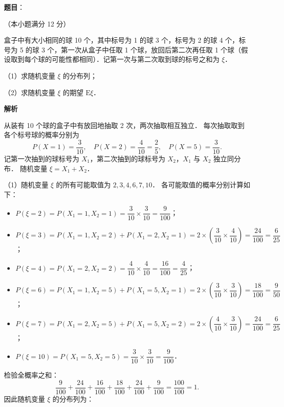 \begin{answer}

\textbf{题目}：

（本小题满分 12 分）

盒子中有大小相同的球 10 个，其中标号为 1 的球 3 个，标号为 2 的球 4 个，标号为 5 的球 3 个，第一次从盒子中任取 1 个球，放回后第二次再任取 1 个球（假设取到每个球的可能性都相同）．记第一次与第二次取到球的标号之和为 $\xi$．

（1）求随机变量 $\xi$ 的分布列；

（2）求随机变量 $\xi$ 的期望 $\mathrm{E}\xi$．

\textbf{解析}

从装有 10 个球的盒子中有放回地抽取 2 次，两次抽取相互独立．
每次抽取取到各个标号球的概率分别为
\nopagebreak[4]
\[
P(X = 1) = \frac{3}{10}, \quad P(X = 2) = \frac{4}{10} = \frac{2}{5}, \quad P(X = 5) = \frac{3}{10}.
\]
记第一次抽到的球标号为 $X_1$，第二次抽到的球标号为 $X_2$，$X_1$ 与 $X_2$ 独立同分布．
随机变量 $\xi = X_1 + X_2$．

（1）随机变量 $\xi$ 的所有可能取值为 $2, 3, 4, 6, 7, 10$．
各可能取值的概率分别计算如下：
\begin{itemize}
\item $P(\xi = 2) = P(X_1 = 1, X_2 = 1) = \dfrac{3}{10} \times \dfrac{3}{10} = \dfrac{9}{100}$；
\item $P(\xi = 3) = P(X_1 = 1, X_2 = 2) + P(X_1 = 2, X_2 = 1) = 2 \times \left(\dfrac{3}{10} \times \dfrac{4}{10}\right) = \dfrac{24}{100} = \dfrac{6}{25}$；
\item $P(\xi = 4) = P(X_1 = 2, X_2 = 2) = \dfrac{4}{10} \times \dfrac{4}{10} = \dfrac{16}{100} = \dfrac{4}{25}$；
\item $P(\xi = 6) = P(X_1 = 1, X_2 = 5) + P(X_1 = 5, X_2 = 1) = 2 \times \left(\dfrac{3}{10} \times \dfrac{3}{10}\right) = \dfrac{18}{100} = \dfrac{9}{50}$；
\item $P(\xi = 7) = P(X_1 = 2, X_2 = 5) + P(X_1 = 5, X_2 = 2) = 2 \times \left(\dfrac{4}{10} \times \dfrac{3}{10}\right) = \dfrac{24}{100} = \dfrac{6}{25}$；
\item $P(\xi = 10) = P(X_1 = 5, X_2 = 5) = \dfrac{3}{10} \times \dfrac{3}{10} = \dfrac{9}{100}$．
\end{itemize}

检验全概率之和：
\nopagebreak[4]
\[
\frac{9}{100} + \frac{24}{100} + \frac{16}{100} + \frac{18}{100} + \frac{24}{100} + \frac{9}{100} = \frac{100}{100} = 1.
\]
因此随机变量 $\xi$ 的分布列为：


\end{answer}
